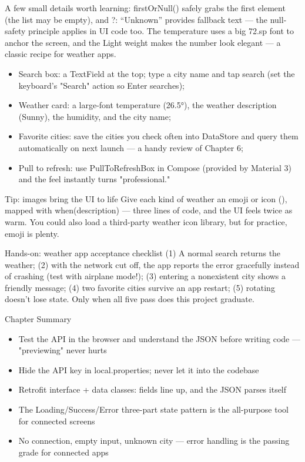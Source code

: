 A few small details worth learning: firstOrNull() safely grabs the first element (the list may be empty), and ?: “Unknown” provides fallback text — the null-safety principle applies in UI code too. The temperature uses a big 72.sp font to anchor the screen, and the Light weight makes the number look elegant — a classic recipe for weather apps.



\begin{itemize}
  \item Search box: a TextField at the top; type a city name and tap search (set the keyboard's "Search" action so Enter searches);
  \item Weather card: a large-font temperature (26.5°), the weather description (Sunny), the humidity, and the city name;
  \item Favorite cities: save the cities you check often into DataStore and query them automatically on next launch — a handy review of Chapter 6;
  \item Pull to refresh: use PullToRefreshBox in Compose (provided by Material 3) and the feel instantly turns "professional."
\end{itemize}

\begin{tcbinfo}{Tip: images bring the UI to life}
Give each kind of weather an emoji or icon (), mapped with when(description) — three lines of code, and the UI feels twice as warm. You could also load a third-party weather icon library, but for practice, emoji is plenty.

\end{tcbinfo}

\begin{tcbpractice}{Hands-on: weather app acceptance checklist}
(1) A normal search returns the weather; (2) with the network cut off, the app reports the error gracefully instead of crashing (test with airplane mode!); (3) entering a nonexistent city shows a friendly message; (4) two favorite cities survive an app restart; (5) rotating doesn't lose state. Only when all five pass does this project graduate.

\end{tcbpractice}

\begin{tcbsummary}{Chapter Summary}
\begin{itemize}
  \item Test the API in the browser and understand the JSON before writing code — "previewing" never hurts
  \item Hide the API key in local.properties; never let it into the codebase
  \item Retrofit interface + data classes: fields line up, and the JSON parses itself
  \item The Loading/Success/Error three-part state pattern is the all-purpose tool for connected screens
  \item No connection, empty input, unknown city — error handling is the passing grade for connected apps
\end{itemize}

\end{tcbsummary}
